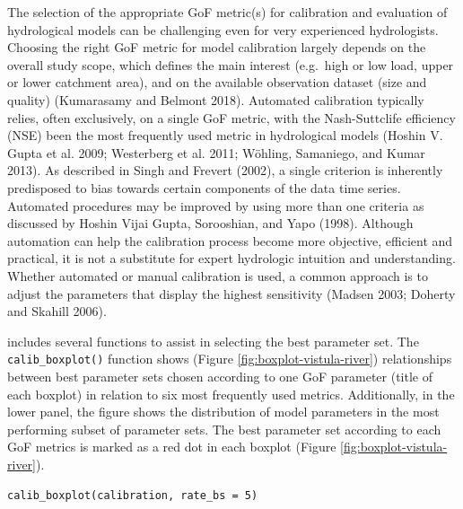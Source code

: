 \noindent The selection of the appropriate GoF metric(s) for calibration and evaluation of hydrological models can be challenging even for very experienced hydrologists. Choosing the right GoF metric for model calibration largely depends on the overall study scope, which defines the main interest (e.g.~high or low load, upper or lower catchment area), and on the available observation dataset (size and quality) (Kumarasamy and Belmont 2018). Automated calibration typically relies, often exclusively, on a single GoF metric, with the Nash-Suttclife efficiency (NSE) been the most frequently used metric in hydrological models (Hoshin V. Gupta et al. 2009; Westerberg et al. 2011; Wöhling, Samaniego, and Kumar 2013). As described in Singh and Frevert (2002), a single criterion is inherently predisposed to bias towards certain components of the data time series. Automated procedures may be improved by using more than one criteria as discussed by Hoshin Vijai Gupta, Sorooshian, and Yapo (1998). Although automation can help the calibration process become more objective, efficient and practical, it is not a substitute for expert hydrologic intuition and understanding. Whether automated or manual calibration is used, a common approach is to adjust the parameters that display the highest sensitivity (Madsen 2003; Doherty and Skahill 2006).

 includes several functions to assist in selecting the best parameter set. The \texttt{calib\_boxplot()} function shows (Figure \ref{fig:boxplot-vistula-river}) relationships between best parameter sets chosen according to one GoF parameter (title of each boxplot) in relation to six most frequently used metrics. Additionally, in the lower panel, the figure shows the distribution of model parameters in the most performing subset of parameter sets. The best parameter set according to each GoF metrics is marked as a red dot in each boxplot (Figure \ref{fig:boxplot-vistula-river}).

\begin{verbatim}
calib_boxplot(calibration, rate_bs = 5)
\end{verbatim}


